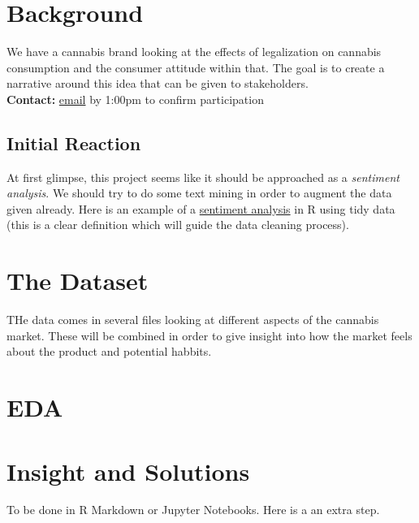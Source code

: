 \documentclass[12pt,a4paper]{book}
\begin{document}
\section{Background}
We have a cannabis brand looking at the effects of legalization on cannabis consumption and the consumer attitude within that. The goal is to create a narrative around this idea that can be given to stakeholders. \\
\textbf{Contact:} \href{mailto: }{email} by 1:00pm to confirm participation 

\subsection{Initial Reaction}
At first glimpse, this project seems like it should be approached as a \textit{sentiment analysis}. We should try to do some text mining in order to augment the data given already. Here is an example of a \href{https://www.tidytextmining.com/sentiment.html}{sentiment analysis} in R using tidy data (this is a clear definition which will guide the data cleaning process).


\section{The Dataset}
THe data comes in several files looking at different aspects of the cannabis market. These will be combined in order to give insight into how the market feels about the product and potential habbits. 

\section{EDA}

\section{Insight and Solutions}
To be done in R Markdown or Jupyter Notebooks. Here is a an extra step.
\end{document}
